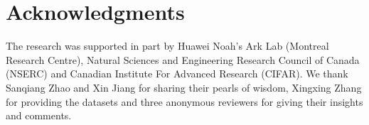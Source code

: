 \documentclass[11pt,a4paper]{article}
\begin{document}
\section*{Acknowledgments}
The research was supported in part by Huawei Noah's Ark Lab (Montreal Research Centre), Natural Sciences and Engineering Research Council of Canada (NSERC) and Canadian Institute For Advanced Research (CIFAR). We thank Sanqiang Zhao and Xin Jiang for sharing their pearls of wisdom, Xingxing Zhang for providing the datasets and three anonymous reviewers for giving  their insights and comments. 



















\appendix
\end{document}

